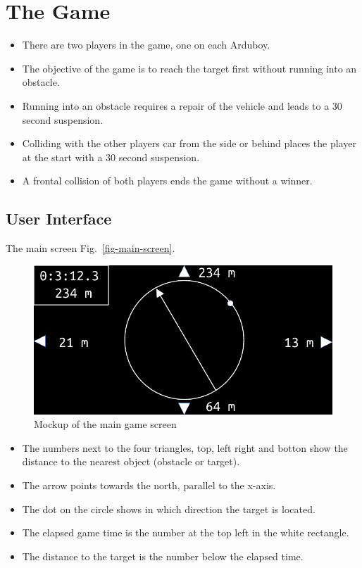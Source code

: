 \documentclass[11pt]{article}
\newcommand{\figref}[1]{Fig.~\eqref{#1}}
\begin{document}
\section{The Game}
\label{sec-the-game}
\begin{itemize}
    \item There are two players in the game, one on each Arduboy.
    \item The objective of the game is to reach the target first without
        running into an obstacle.
    \item Running into an obstacle requires a repair of the vehicle and leads
        to a 30 second suspension.
    \item Colliding with the other players car from the side or behind places
        the player at the start with a 30 second suspension.
    \item A frontal collision of both players ends the game without a winner.
\end{itemize}

\subsection{User Interface}
\label{sec-user-interface}
The main screen \figref{fig-main-screen}.
\begin{figure}
    \includegraphics[width=\textwidth]{screen.pdf}
\caption{Mockup of the main game screen}\label{fig-main-screen}
\end{figure}
\begin{itemize}
    \item The numbers next to the four triangles, top, left right and botton
        show the distance to the nearest object (obstacle or target).
    \item The arrow points towards the north, parallel to the x-axis.
    \item The dot on the circle shows in which direction the target is
        located.
    \item The elapsed game time is the number at the top left in the white
        rectangle.
    \item The distance to the target is the number below the elapsed time.
\end{itemize}
\end{document}
